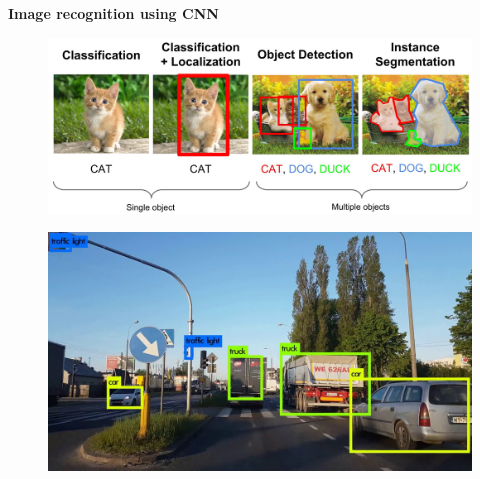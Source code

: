 \documentclass[xcolor=dvipsnames]{beamer}
\begin{document}
\begin{frame}{\bf Image recognition using CNN}

\begin{figure}
  \includegraphics[scale=0.09]{../../pictures/nn_image.jpg}
\end{figure}

\begin{figure}
  \includegraphics[scale=0.15]{../../pictures/nn_detection.jpg}
\end{figure}

\end{frame}
\end{document}
